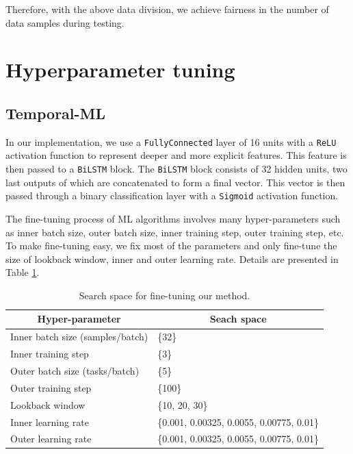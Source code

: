 \documentclass[a4paper,fleqn]{cas-sc}
\begin{document}
Therefore, with the above data division, we achieve fairness in the number of data samples during testing.

\section{Hyperparameter tuning}
\label{app:tuning}

\subsection{Temporal-ML}

In our implementation, we use a \verb|FullyConnected| layer of 16 units with a \verb|ReLU| activation function to represent deeper and more explicit features. This feature is then passed to a \verb|BiLSTM| block. The \verb|BiLSTM| block consists of 32 hidden units, two last outputs of which are concatenated to form a final vector. This vector is then passed through a binary classification layer with a \verb|Sigmoid| activation function.

\vspace{1mm}

The fine-tuning process of ML algorithms involves many hyper-parameters such as inner batch size, outer batch size, inner training step, outer training step, etc. To make fine-tuning easy, we fix most of the parameters and only fine-tune the size of lookback window, inner and outer learning rate. Details are presented in Table \ref{tab:our_finetune}.

\begin{table}[H]
    \centering
    \caption{Search space for fine-tuning our method.}
    \label{tab:our_finetune}
    \begin{tabular}{ll} 
        \toprule
        \multicolumn{1}{c}{Hyper-parameter} & \multicolumn{1}{c}{Seach space}   \\ 
        \hline
        Inner batch size (samples/batch)    & \{32\}                            \\
        Inner training step                 & \{3\}                             \\
        Outer batch size (tasks/batch)      & \{5\}                             \\
        Outer training step                 & \{100\}                           \\ 
        \hline
        Lookback window                     & \{10, 20, 30\}                    \\
        Inner learning rate                 & \{0.001, 0.00325, 0.0055, 0.00775, 0.01\}\\
        Outer learning rate                 & \{0.001, 0.00325, 0.0055, 0.00775, 0.01\}\\
        \bottomrule
    \end{tabular}
\end{table}
\end{document}
